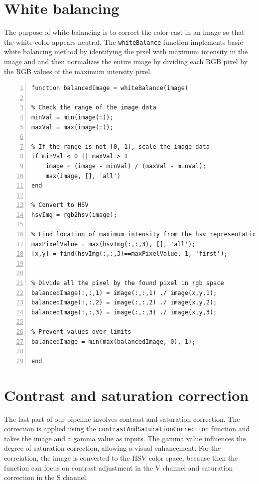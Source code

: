 \documentclass[12pt,a4paper,english
]{tunithesis}
\begin{document}
\section{White balancing}
The purpose of white balancing is to correct the color cast in an image so that the white color appears neutral. The \texttt{whiteBalance} function implements basic white balancing method by identifying the pixel with maximum intensity in the image and and then normalizes the entire image by dividing each RGB pixel by the RGB values of the maximum intensity pixel. 
\begin{lstlisting}[style=Matlab-editor, numbers=left, basicstyle=\small]
function balancedImage = whiteBalance(image)

% Check the range of the image data
minVal = min(image(:));
maxVal = max(image(:));

% If the range is not [0, 1], scale the image data
if minVal < 0 || maxVal > 1
    image = (image - minVal) / (maxVal - minVal);
    max(image, [], 'all')
end

% Convert to HSV
hsvImg = rgb2hsv(image);

% Find location of maximum intensity from the hsv representation
maxPixelValue = max(hsvImg(:,:,3), [], 'all');
[x,y] = find(hsvImg(:,:,3)==maxPixelValue, 1, 'first');


% Divide all the pixel by the found pixel in rgb space
balancedImage(:,:,1) = image(:,:,1) ./ image(x,y,1);
balancedImage(:,:,2) = image(:,:,2) ./ image(x,y,2);
balancedImage(:,:,3) = image(:,:,3) ./ image(x,y,3);

% Prevent values over limits
balancedImage = min(max(balancedImage, 0), 1);

end
\end{lstlisting}

\section{Contrast and saturation correction}
The last part of our pipeline involves contrast and saturation correction. The correction is applied using the \texttt{contrastAndSaturationCorrection} function and takes the image and a gamma value as inputs. The gamma value influences the degree of saturation correction, allowing a visual enhancement. For the correlation, the image is converted to the HSV color space, because then the function can focus on contrast adjustment in the V channel and saturation correction in the S channel.
\end{document}

